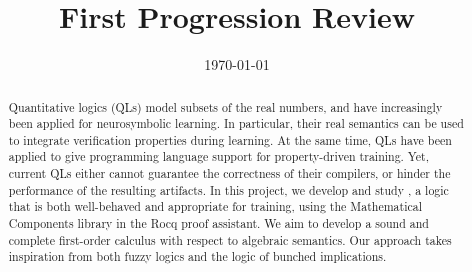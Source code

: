 \documentclass[sotoncolour]{uosthesis}      %
\title      {First Progression Review}
\date       {\today}
\begin{document}
\maketitle
\begin{abstract}

Quantitative logics (QLs) model subsets of the real numbers, and have increasingly been applied for neurosymbolic learning. In particular, their real semantics can be used to integrate verification properties during learning. At the same time, QLs have been applied to give programming language support for property-driven training. Yet, current QLs either cannot guarantee the correctness of their compilers, or hinder the performance of the resulting artifacts. In this project, we develop and study \textit{\OurLogic{}}, a logic that is both well-behaved and appropriate for training, using the Mathematical Components library in the Rocq proof assistant. We aim to develop a sound and complete first-order calculus with respect to algebraic semantics. Our approach takes inspiration from both fuzzy logics and the logic of bunched implications.

\end{abstract}

\end{document}
